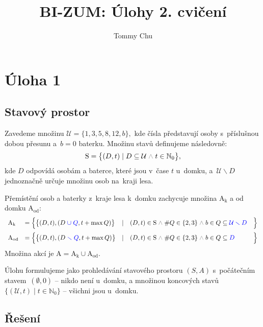 \documentclass{article}
\title{BI-ZUM: Úlohy 2. cvičení}
\author{Tommy Chu}
\date{}
\newcommand{\Nz}{\mathbb{N}_0}
\newcommand{\U}{\mathcal{U}}
\newcommand{\mS}{\text{S}}
\newcommand{\A}{\text{A}}
\newcommand{\mand}{\;{\color{gray} \land}\;}
\begin{document}
\maketitle

\section*{Úloha 1}

\subsection*{Stavový prostor}

Zavedeme množinu
\(
\U = \{ 1, 3, 5, 8, 12, b \},
\)
kde čísla představují osoby s~příslušnou dobou přesunu a~$b = 0$ baterku.
Množinu stavů definujeme následovně:
\[
    \mS = \big\{
    (D, t) \mid D \subseteq \U \mand t \in \Nz
    \big\},
\]
kde $D$ odpovídá osobám a baterce, které jsou v~čase $t$ u~domku, a~$\U \smallsetminus D$ jednoznačně určuje množinu osob na~kraji lesa.

Přemístění osob a baterky z~kraje lesa k~domku zachycuje množina $\A_\text{k}$
a od domku $\A_\text{od}$:
\[
    \begin{array}{llllll}
        \A_\text{k}
         & = \Big\{
        \big\{ (D, t), (D {\color{blue} \;\cup\; Q}, t + \max Q) \big\}
         & \mid
         & (D, t) \in \mS \mand \# Q \in \{2, 3\}
        \mand b \in Q \subseteq  {\color{blue} \U\smallsetminus D}
         & \Big\}

        \\[3mm]

        \A_\text{od}
         & = \Big\{
        \big\{ (D, t), (D {\color{blue} \;\smallsetminus\; Q}, t + \max Q) \big\}
         & \mid
         & (D, t) \in \mS \mand \# Q \in \{2, 3\}
        \mand b \in Q \subseteq {\color{blue} D}
         & \Big\}
    \end{array}
\]
Množina akcí je $\A = \A_\text{k} \cup \A_\text{od}$.

Úlohu formulujeme jako prohledávání stavového prostoru $(S, A)$ s~počátečním stavem~$(\emptyset, 0)$ -- nikdo není u~domku, a množinou koncových stavů~$\{ (\U, t) \mid t \in \Nz \}$ -- všichni jsou u~domku.

\subsection*{Řešení}
\end{document}
